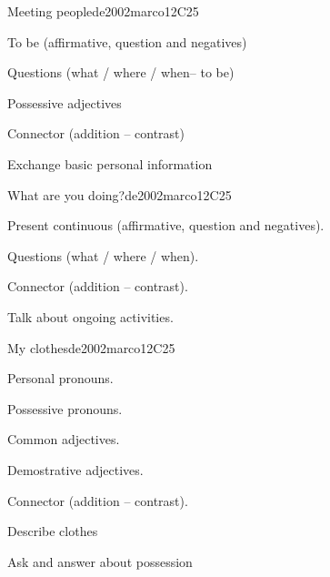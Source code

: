 \begin{syllabus}
\begin{unit}{Meeting people}{}{de2002marco}{12}{C25}
   \begin{topics}
      \item To be (affirmative, question and negatives)
      \item Questions (what / where / when– to be)
      \item Possessive adjectives
      \item Connector (addition – contrast)
   \end{topics}

   \begin{learningoutcomes}
      \item Exchange basic personal information  
   \end{learningoutcomes}

\end{unit}

\begin{unit}{What are you doing?}{}{de2002marco}{12}{C25}
   \begin{topics}
      \item Present continuous (affirmative, question and negatives).
      \item Questions (what / where / when).
      \item Connector (addition – contrast).
   \end{topics}

   \begin{learningoutcomes}
      \item Talk about ongoing activities.
   \end{learningoutcomes}

\end{unit}

\begin{unit}{My clothes}{}{de2002marco}{12}{C25}
   \begin{topics}
      \item Personal pronouns.
      \item Possessive pronouns.
      \item Common adjectives.
      \item Demostrative adjectives.
      \item Connector (addition – contrast).
   \end{topics}

   \begin{learningoutcomes}
      \item Describe clothes
      \item Ask and answer about possession
   \end{learningoutcomes}


\end{unit}
\end{syllabus}
